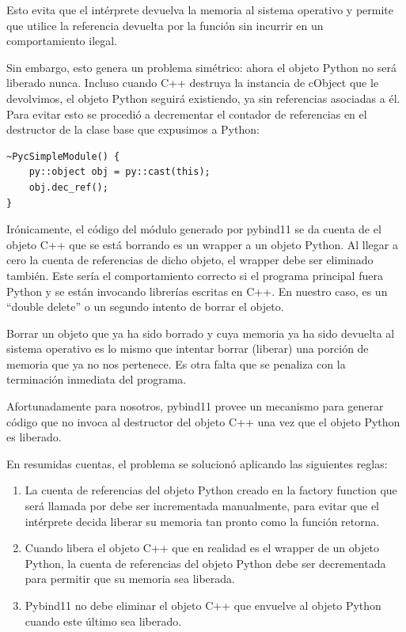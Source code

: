 \documentclass[]{article}
\begin{document}
Esto evita que el intérprete devuelva la memoria al sistema operativo y permite
que \omnetpp{} utilice la referencia devuelta por la función sin incurrir en un
comportamiento ilegal.

Sin embargo, esto genera un problema simétrico: ahora el objeto Python no será
liberado nunca. Incluso cuando C++ destruya la instancia de cObject que le
devolvimos, el objeto Python seguirá existiendo, ya sin referencias asociadas a
él. Para evitar esto se procedió a decrementar el contador de referencias en el
destructor de la clase base que expusimos a Python:

\begin{verbatim}
~PycSimpleModule() {
    py::object obj = py::cast(this);
    obj.dec_ref();
} 
\end{verbatim}

Irónicamente, el código del módulo generado por pybind11 se da cuenta de el
objeto C++ que se está borrando es un wrapper a un objeto Python. Al llegar a
cero la cuenta de referencias de dicho objeto, el wrapper debe ser eliminado
también. Este sería el comportamiento correcto si el programa principal fuera
Python y se están invocando librerías escritas en C++. En nuestro caso, es un
``double delete'' o un segundo intento de borrar el objeto.

Borrar un objeto que ya ha sido borrado y cuya memoria ya ha sido devuelta al
sistema operativo es lo mismo que intentar borrar (liberar) una porción de
memoria que ya no nos pertenece. Es otra falta que se penaliza con la
terminación inmediata del programa.

Afortunadamente para nosotros, pybind11 provee un mecanismo para generar código
que no invoca al destructor del objeto C++ una vez que el objeto Python es
liberado.

En resumidas cuentas, el problema se solucionó aplicando las siguientes reglas:

\begin{enumerate}
    \item La cuenta de referencias del objeto Python creado en la factory
function que será llamada por \omnetpp{} debe ser incrementada manualmente,
para evitar que el intérprete decida liberar su memoria tan pronto como la
función retorna.

    \item Cuando \omnetpp{} libera el objeto C++ que en realidad es el wrapper
de un objeto Python, la cuenta de referencias del objeto Python debe ser
decrementada para permitir que su memoria sea liberada.

    \item Pybind11 no debe eliminar el objeto C++ que envuelve al objeto Python
cuando este último sea liberado.
\end{enumerate}
\end{document}
